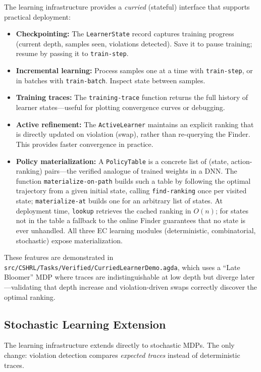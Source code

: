 \documentclass[9pt,a4paper]{article}
\newcommand{\fpath}[1]{\nolinkurl{#1}}
\theoremstyle{plain}
\theoremstyle{definition}
\theoremstyle{remark}
\begin{document}
The learning infrastructure provides a \emph{curried} (stateful) interface that supports practical deployment:

\begin{itemize}
\item \textbf{Checkpointing:} The \texttt{LearnerState} record captures training progress (current depth, samples seen, violations detected). Save it to pause training; resume by passing it to \texttt{train-step}.
\item \textbf{Incremental learning:} Process samples one at a time with \texttt{train-step}, or in batches with \texttt{train-batch}. Inspect state between samples.
\item \textbf{Training traces:} The \texttt{training-trace} function returns the full history of learner states---useful for plotting convergence curves or debugging.
\item \textbf{Active refinement:} The \texttt{ActiveLearner} maintains an explicit ranking that is directly updated on violation (swap), rather than re-querying the Finder. This provides faster convergence in practice.
\item \textbf{Policy materialization:} A \texttt{PolicyTable} is a concrete list of (state, action-ranking) pairs---the verified analogue of trained weights in a DNN.  The function \texttt{materialize-on-path} builds such a table by following the optimal trajectory from a given initial state, calling \texttt{find-ranking} once per visited state; \texttt{materialize-at} builds one for an arbitrary list of states.  At deployment time, \texttt{lookup} retrieves the cached ranking in $O(n)$; for states not in the table a fallback to the online Finder guarantees that no state is ever unhandled.  All three EC learning modules (deterministic, combinatorial, stochastic) expose materialization.
\end{itemize}

\noindent These features are demonstrated in \fpath{src/CSHRL/Tasks/Verified/CurriedLearnerDemo.agda}, which uses a ``Late Bloomer'' MDP where traces are indistinguishable at low depth but diverge later---validating that depth increase and violation-driven swaps correctly discover the optimal ranking.

\subsection{Stochastic Learning Extension}\label{sec:stoch-learning}

The learning infrastructure extends directly to stochastic MDPs. The only change: violation detection compares \emph{expected traces} instead of deterministic traces.
\end{document}
